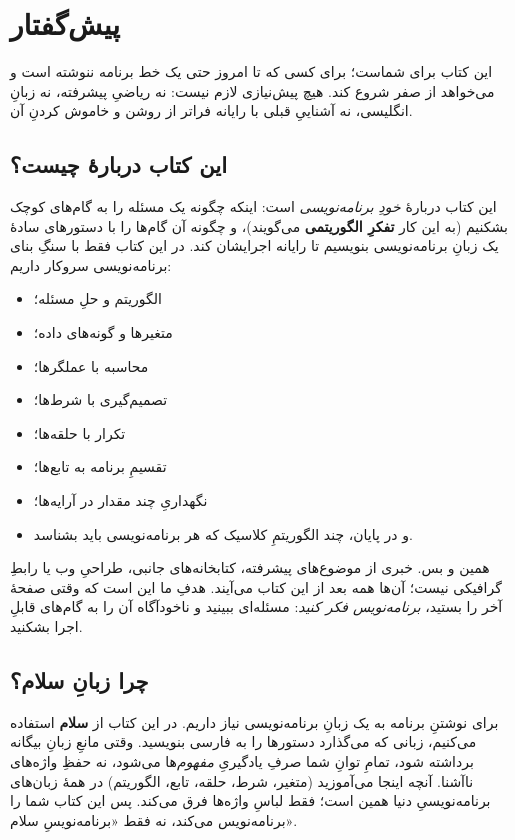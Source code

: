 \chapter*{پیش‌گفتار}

این کتاب برای شماست؛ برای کسی که تا امروز حتی یک خط برنامه ننوشته است و
می‌خواهد از صفر شروع کند. هیچ پیش‌نیازی لازم نیست: نه ریاضیِ پیشرفته، نه
زبانِ انگلیسی، نه آشناییِ قبلی با رایانه فراتر از روشن و خاموش کردنِ آن.

\section*{این کتاب دربارهٔ چیست؟}

این کتاب دربارهٔ \emph{خودِ برنامه‌نویسی} است: اینکه چگونه یک مسئله را به
گام‌های کوچک بشکنیم (به این کار \textbf{تفکرِ الگوریتمی} می‌گویند)، و چگونه آن
گام‌ها را با دستورهای سادهٔ یک زبانِ برنامه‌نویسی بنویسیم تا رایانه اجرایشان
کند. در این کتاب فقط با سنگِ بنای برنامه‌نویسی سروکار داریم:

\begin{itemize}
  \item الگوریتم و حلِ مسئله؛
  \item متغیرها و گونه‌های داده؛
  \item محاسبه با عملگرها؛
  \item تصمیم‌گیری با شرط‌ها؛
  \item تکرار با حلقه‌ها؛
  \item تقسیمِ برنامه به تابع‌ها؛
  \item نگهداریِ چند مقدار در آرایه‌ها؛
  \item و در پایان، چند الگوریتمِ کلاسیک که هر برنامه‌نویسی باید بشناسد.
\end{itemize}

همین و بس. خبری از موضوع‌های پیشرفته، کتابخانه‌های جانبی، طراحیِ وب یا
رابطِ گرافیکی نیست؛ آن‌ها همه بعد از این کتاب می‌آیند. هدفِ ما این است که
وقتی صفحهٔ آخر را بستید، \emph{برنامه‌نویس فکر کنید}: مسئله‌ای ببینید و
ناخودآگاه آن را به گام‌های قابلِ اجرا بشکنید.

\section*{چرا زبانِ سلام؟}

برای نوشتنِ برنامه به یک زبانِ برنامه‌نویسی نیاز داریم. در این کتاب از
\textbf{سلام} استفاده می‌کنیم، زبانی که می‌گذارد دستورها را به فارسی
بنویسید. وقتی مانعِ زبانِ بیگانه برداشته شود، تمامِ توانِ شما صرفِ یادگیریِ
\emph{مفهوم}‌ها می‌شود، نه حفظِ واژه‌های ناآشنا. آنچه اینجا می‌آموزید
(متغیر، شرط، حلقه، تابع، الگوریتم) در همهٔ زبان‌های برنامه‌نویسیِ دنیا همین
است؛ فقط لباسِ واژه‌ها فرق می‌کند. پس این کتاب شما را برنامه‌نویس می‌کند،
نه فقط «برنامه‌نویسِ سلام».

